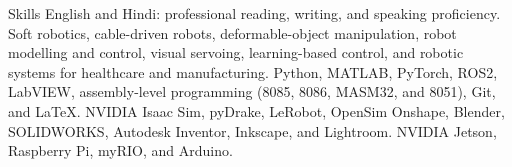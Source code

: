 
\begin{rubric}{Skills}
\entry*[Languages]
	English and Hindi: professional reading, writing, and speaking proficiency.
	Soft robotics, cable-driven robots, deformable-object manipulation, robot modelling and control, visual servoing, learning-based control, and robotic systems for healthcare and manufacturing.
\entry*[Programming]
	Python, MATLAB, PyTorch, ROS2, LabVIEW, assembly-level programming (8085, 8086, MASM32, and 8051), Git, and LaTeX.
\entry*[Simulation] NVIDIA Isaac Sim, pyDrake, LeRobot, OpenSim 
	Onshape, Blender, SOLIDWORKS, Autodesk Inventor, Inkscape, and Lightroom.
\entry*[Hardware]
	NVIDIA Jetson, Raspberry Pi, myRIO, and Arduino.
\end{rubric}
